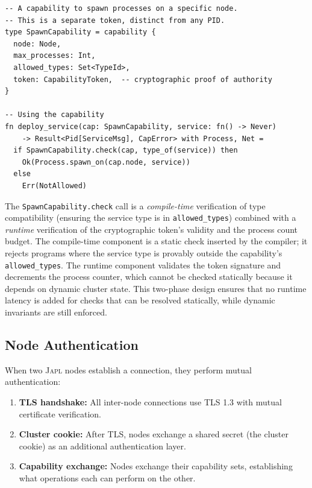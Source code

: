 \documentclass[11pt,a4paper]{article}
\newcommand{\japl}{\textsc{Japl}}
\begin{document}
\begin{lstlisting}
-- A capability to spawn processes on a specific node.
-- This is a separate token, distinct from any PID.
type SpawnCapability = capability {
  node: Node,
  max_processes: Int,
  allowed_types: Set<TypeId>,
  token: CapabilityToken,  -- cryptographic proof of authority
}

-- Using the capability
fn deploy_service(cap: SpawnCapability, service: fn() -> Never)
    -> Result<Pid[ServiceMsg], CapError> with Process, Net =
  if SpawnCapability.check(cap, type_of(service)) then
    Ok(Process.spawn_on(cap.node, service))
  else
    Err(NotAllowed)
\end{lstlisting}

\noindent The \texttt{SpawnCapability.check} call is a \emph{compile-time}
verification of type compatibility (ensuring the service type is in
\texttt{allowed\_types}) combined with a \emph{runtime} verification of
the cryptographic token's validity and the process count budget. The
compile-time component is a static check inserted by the compiler; it
rejects programs where the service type is provably outside the capability's
\texttt{allowed\_types}. The runtime component validates the token signature
and decrements the process counter, which cannot be checked statically
because it depends on dynamic cluster state. This two-phase design ensures
that no runtime latency is added for checks that can be resolved
statically, while dynamic invariants are still enforced.

\subsection{Node Authentication}

When two \japl{} nodes establish a connection, they perform mutual
authentication:

\begin{enumerate}[nosep]
  \item \textbf{TLS handshake:} All inter-node connections use TLS 1.3
        with mutual certificate verification.
  \item \textbf{Cluster cookie:} After TLS, nodes exchange a shared
        secret (the cluster cookie) as an additional authentication layer.
  \item \textbf{Capability exchange:} Nodes exchange their capability
        sets, establishing what operations each can perform on the other.
\end{enumerate}
\end{document}
